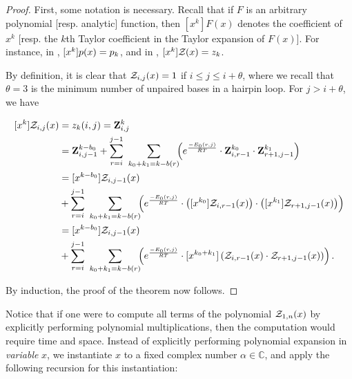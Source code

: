 \documentclass[11pt, oneside]{Thesis} %
\begin{document}
\begin{proof}
First, some notation is necessary.
Recall that if $F$ is an arbitrary
polynomial [resp. analytic] function, then $[x^k]F(x)$
denotes the coefficient of $x^k$ [resp. the $k$th Taylor coefficient in the
Taylor expansion of $F(x)$]. For instance, in
, $[x^k]p(x) = p_k$, and in
, $[x^k]{\mathcal Z}_{}(x) = z_k$.

By definition, it is clear that ${\mathcal Z}_{i,j}(x)=1$ if $i \leq j \leq i + \theta$,
where we recall that $\theta = 3$ is the minimum number of unpaired bases in
a hairpin loop. For $j > i + \theta$, we have

\begin{align}
\begin{split}
[x^k] \emZ{i,j} &= z_k(i,j) = \bfZ{k}{i,j} \\
&= \bfZ{k-b_0}{i,j-1} +
\sum_{r=i}^{j-1}\hspace{2.25em} \sum_{\mathclap{k_0+k_1=k-b(r)}}\hspace{1.5em}
\left( \boltzNuss{r,j} \cdot \bfZ{k_0}{i,r-1} \cdot \bfZ{k_1}{r+1,j-1} \right) \\
&= [x^{k-b_0}] \emZ{i,j-1} \\
&+ \sum_{r=i}^{j-1}\hspace{2.25em} \sum_{\mathclap{k_0+k_1=k-b(r)}}\hspace{1.5em}
\left( \boltzNuss{r,j} \cdot \left( [x^{k_0}] \emZ{i,r-1} \right) \cdot
\left( [x^{k_1}] \emZ{r+1,j-1} \right) \right) \\
&= [x^{k-b_0}] \emZ{i,j-1} \\
&+ \sum_{r=i}^{j-1}\hspace{2.25em} \sum_{\mathclap{k_0+k_1=k-b(r)}}\hspace{1.5em}
\left( \boltzNuss{r,j} \cdot [x^{k_0+k_1}]
\left( \emZ{i,r-1} \cdot \emZ{r+1,j-1} \right) \right).\\
\end{split}
\end{align}

By induction, the proof of the theorem now follows.
\end{proof}

Notice that if one were to compute all terms of the polynomial ${\mathcal Z}_{1,n}(x)$
by explicitly performing polynomial multiplications,
then the computation would require  time and  space.
Instead of explicitly performing polynomial expansion in {\em variable} $x$,
we instantiate $x$ to a fixed complex number $\alpha \in \mathbb{C}$, and apply
the following recursion for this instantiation:
\end{document}

